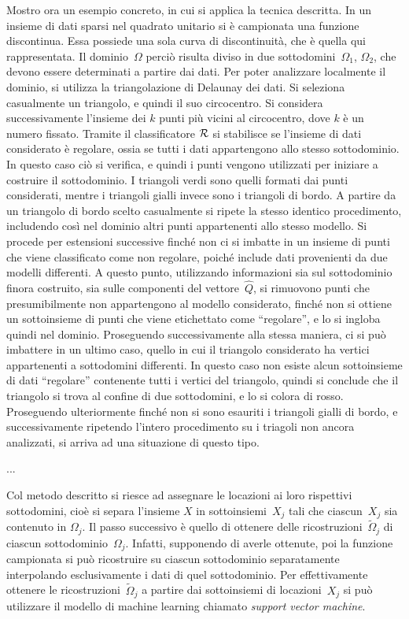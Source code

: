 Mostro ora un esempio concreto, in cui si applica la tecnica descritta.  In un insieme di dati sparsi nel quadrato unitario  si è campionata una funzione discontinua.  Essa possiede una sola curva di discontinuità, che è quella qui rappresentata.  Il dominio~$\Omega$ perciò risulta diviso in due sottodomini~$\Omega_1$, $\Omega_2$, che devono essere determinati a partire dai dati.
Per poter analizzare localmente il dominio, si utilizza la triangolazione di Delaunay dei dati.  Si seleziona casualmente un triangolo, e quindi il suo circocentro.   Si considera successivamente l’insieme dei $k$ punti più vicini al circocentro, dove $k$ è un numero  fissato.  Tramite il classificatore $\cal R$ si stabilisce se l’insieme di dati considerato è regolare, ossia se tutti i dati appartengono allo stesso sottodominio.   In questo caso ciò si verifica, e quindi i punti vengono utilizzati per iniziare a costruire il sottodominio.  I triangoli verdi sono quelli formati dai punti considerati, mentre i triangoli gialli invece sono i triangoli di bordo.  A partire da un triangolo di bordo scelto casualmente si ripete la stesso identico procedimento, includendo così nel dominio altri punti appartenenti allo stesso modello.  Si procede per estensioni successive finché non ci si imbatte in un insieme di punti che viene classificato come non regolare, poiché include dati provenienti da due modelli differenti.  A questo punto, utilizzando informazioni sia sul sottodominio finora costruito, sia sulle componenti del vettore~$\widehat Q$, si rimuovono punti che presumibilmente non appartengono al modello considerato, finché non si ottiene un sottoinsieme di punti che viene etichettato come “regolare”, e lo si ingloba quindi nel dominio.  Proseguendo successivamente alla stessa maniera, ci si può imbattere in un ultimo caso, quello in cui il triangolo considerato ha vertici appartenenti  a sottodomini differenti.  In questo caso non esiste alcun sottoinsieme di dati “regolare” contenente tutti i vertici del triangolo, quindi si conclude che il triangolo si trova al confine di due sottodomini, e lo si colora di rosso.   Proseguendo ulteriormente finché non si sono esauriti i triangoli gialli di bordo, e successivamente ripetendo l’intero procedimento su i triagoli non ancora analizzati, si arriva ad una situazione di questo tipo.


...



Col metodo descritto si riesce ad assegnare le locazioni ai loro rispettivi sottodomini, cioè si separa l’insieme $X$ in sottoinsiemi~$X_j$ tali che ciascun~$X_j$ sia contenuto in $\Omega_j$.  Il passo successivo è quello di ottenere delle ricostruzioni~$\tilde\Omega_j$ di ciascun sottodominio~$\Omega_j$.  Infatti, supponendo di averle ottenute, poi la funzione campionata si può ricostruire su ciascun sottodominio separatamente interpolando esclusivamente i dati di quel sottodominio.
Per effettivamente ottenere le ricostruzioni~$\tilde\Omega_j$ a partire dai sottoinsiemi di locazioni~$X_j$ si può utilizzare il modello di machine learning chiamato {\em support vector machine}.



